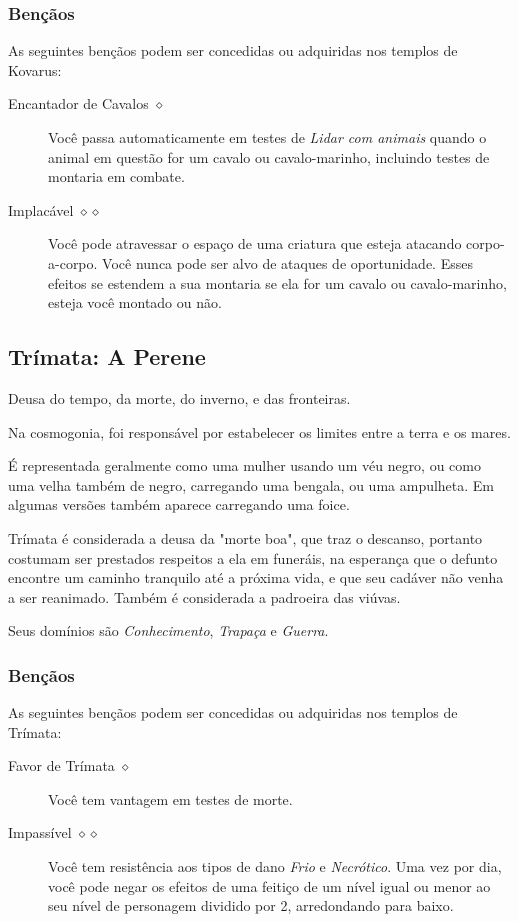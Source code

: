 \documentclass[letterpaper,twocolumn,openany]{dndbook}
\begin{document}
	\subsubsection{Bençãos}
	As seguintes bençãos podem ser concedidas ou adquiridas nos templos de Kovarus:
	\begin{description}
		\item[Encantador de Cavalos $\diamond$]
		Você passa automaticamente em testes de \textit{Lidar com animais} quando o animal em questão for um cavalo ou cavalo-marinho, incluindo testes de montaria em combate.
		\item[Implacável $\diamond\diamond$]
		Você pode atravessar o espaço de uma criatura que esteja atacando corpo-a-corpo. Você nunca pode ser alvo de ataques de oportunidade. Esses efeitos se estendem a sua montaria se ela for um cavalo ou cavalo-marinho, esteja você montado ou não.
	\end{description}
	
	\subsection{Trímata: A Perene}
	Deusa do tempo, da morte, do inverno, e das fronteiras. 
	\par Na cosmogonia, foi responsável por estabelecer os limites entre a terra e os mares.
	\par É representada geralmente como uma mulher usando um véu negro, ou como uma velha também de negro, carregando uma bengala, ou uma ampulheta. Em algumas versões também aparece carregando uma foice.
	\par Trímata é considerada a deusa da "morte boa", que traz o descanso, portanto costumam ser prestados respeitos a ela em funeráis, na esperança que o defunto encontre um caminho tranquilo até a próxima vida, e que seu cadáver não venha a ser reanimado. Também é considerada a padroeira das viúvas.
	\par Seus domínios são \textit{Conhecimento}, \textit{Trapaça} e \textit{Guerra}.
	\subsubsection{Bençãos}
	As seguintes bençãos podem ser concedidas ou adquiridas nos templos de Trímata:
	\begin{description}
		\item[Favor de Trímata $\diamond$]
		Você tem vantagem em testes de morte.
		\item[Impassível $\diamond\diamond$]
		Você tem resistência aos tipos de dano \textit{Frio} e \textit{Necrótico}. Uma vez por dia, você pode negar os efeitos de uma feitiço de um nível igual ou menor ao seu nível de personagem dividido por 2, arredondando para baixo.
	\end{description}
	
\end{document}
